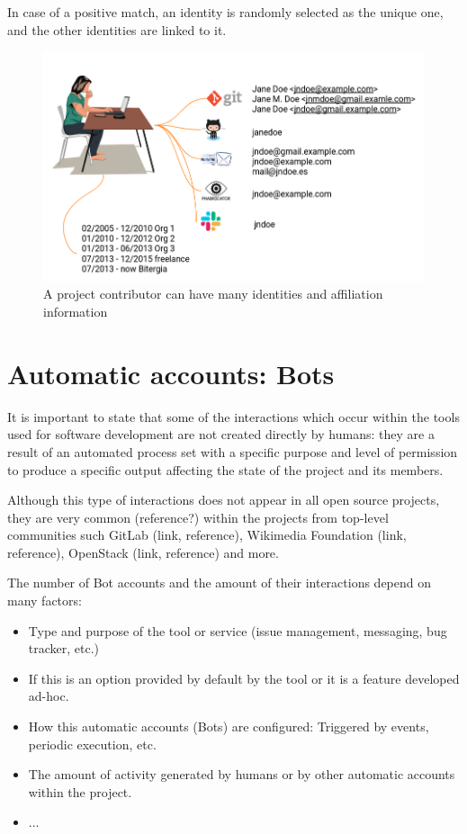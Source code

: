 \documentclass[a4paper, 12pt]{book}
\begin{document}
In case of a positive match, an identity is randomly selected as the unique one, and the other identities are linked to it.

\begin{figure}
 \centering
  \includegraphics[width=12cm, keepaspectratio]{img/example-identity}
  \caption{A project contributor can have many identities and affiliation information}
  \label{fig:example-identity}
\end{figure}

\section{Automatic accounts: Bots}

It is important to state that some of the interactions which occur within the tools used for software development are not created directly by humans: they are a result of an automated process set with a specific purpose and level of permission to produce a specific output affecting the state of the project and its members.

Although this type of interactions does not appear in all open source projects, they are very common (reference?) within the projects from top-level communities such GitLab (link, reference), Wikimedia Foundation (link, reference), OpenStack (link, reference) and more.

The number of Bot accounts and the amount of their interactions depend on many factors:
\begin{itemize}
    \item Type and purpose of the tool or service (issue management, messaging, bug tracker, etc.)
    \item If this is an option provided by default by the tool or it is a feature developed ad-hoc.
    \item How this automatic accounts (Bots) are configured: Triggered by events, periodic execution, etc.
    \item The amount of activity generated by humans or by other automatic accounts within the project.
    \item ...
\end{itemize}
\end{document}
